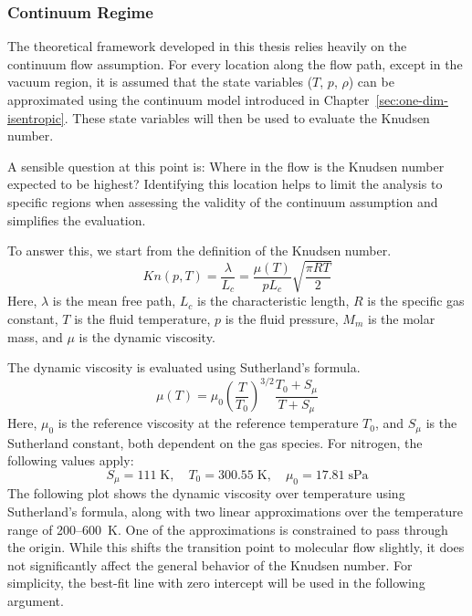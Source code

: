 \subsubsection*{Continuum Regime}
	The theoretical framework developed in this thesis relies heavily on the continuum flow assumption.
	For every location along the flow path, except in the vacuum region, it is assumed that the state variables ($T$, $p$, $\rho$) can be approximated using the continuum model introduced in Chapter~\ref{sec:one-dim-isentropic}.
	These state variables will then be used to evaluate the Knudsen number.

	A sensible question at this point is: Where in the flow is the Knudsen number expected to be highest?
	Identifying this location helps to limit the analysis to specific regions when assessing the validity of the continuum assumption and simplifies the evaluation.

	To answer this, we start from the definition of the Knudsen number.
	\cite{halwidl_development_2016, anderson2021modern}
	$$
		Kn(p,T) = \frac{\lambda}{L_c} = \frac{\mu(T)}{pL_c}\sqrt{\frac{\pi R T}{2}}
	$$
	Here, $\lambda$ is the mean free path, $L_c$ is the characteristic length, $R$ is the specific gas constant, $T$ is the fluid temperature, $p$ is the fluid pressure, $M_m$ is the molar mass, and $\mu$ is the dynamic viscosity.

	The dynamic viscosity is evaluated using Sutherland's formula.
	\cite{Hirschfelder1954MolecularTO}
	\begin{equation}
		\mu(T) = \mu_0 \left(\frac{T}{T_0}\right)^{3/2} \frac{T_0 + S_\mu}{T + S_\mu}
		\label{eq:sutherland}
	\end{equation}
	Here, $\mu_0$ is the reference viscosity at the reference temperature $T_0$, and $S_\mu$ is the Sutherland constant, both dependent on the gas species.
	For nitrogen, the following values apply:
	\cite{kim2004numericalanalysisflowcharacteristics}
	$$
		S_\mu = 111\;\text{K}, \quad T_0 = 300.55\;\text{K}, \quad \mu_0 = 17.81\; \text{sPa}
	$$
	The following plot shows the dynamic viscosity over temperature using Sutherland's formula, along with two linear approximations over the temperature range of 200–600~K.
	One of the approximations is constrained to pass through the origin.
	While this shifts the transition point to molecular flow slightly, it does not significantly affect the general behavior of the Knudsen number.
	For simplicity, the best-fit line with zero intercept will be used in the following argument.
	\newpage
	
	
